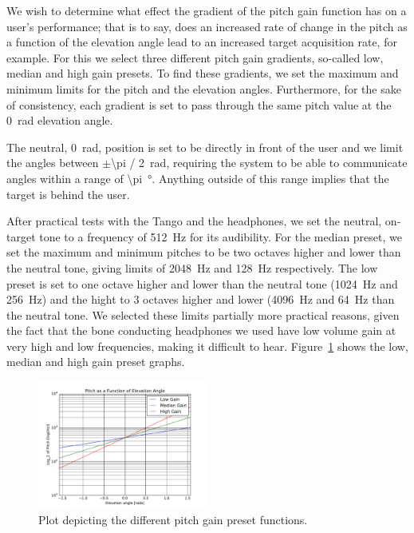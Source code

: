 \documentclass[format=sigconf, review=true, screen=true, anonymous=true]{acmart}
\begin{document}
We wish to determine what effect the gradient of the pitch gain function has on a user's performance; that is to say, does an increased rate of change in the pitch as a function of the elevation angle lead to an increased target acquisition rate, for example. For this we select three different pitch gain gradients, so-called low, median and high gain presets. To find these gradients, we set the maximum and minimum limits for the pitch and the elevation angles. Furthermore, for the sake of consistency, each gradient is set to pass through the same pitch value at the \SI{0}{\radian} elevation angle.   

The neutral, \SI{0}{\radian}, position is set to be directly in front of the user and we limit the angles between $\pm$\SI[quotient-mode=fraction]{\pi / 2}{\radian}, requiring the system to be able to communicate angles within a range of \SI{\pi}{\degree}. Anything outside of this range implies that the target is behind the user. 

After practical tests with the Tango and the headphones, we set the neutral, on-target tone to a frequency of \SI{512}{\hertz} for its audibility. For the median preset, we set the maximum and minimum pitches to be two octaves higher and lower than the neutral tone, giving limits of \SI{2048}{\hertz} and \SI{128}{\hertz} respectively. The low preset is set to one octave higher and lower than the neutral tone (\SI{1024}{\hertz} and \SI{256}{\hertz}) and the hight to 3 octaves higher and lower (\SI{4096}{\hertz} and \SI{64}{\hertz} than the neutral tone. We selected these limits partially more practical reasons, given the fact that the bone conducting headphones we used have low volume gain at very high and low frequencies, making it difficult to hear. Figure~\ref{fig:pitch-preset-plot} shows the low, median and high gain preset graphs.  

\begin{figure}
  \centering
  \includegraphics[width=0.5\textwidth]{figures/pitch_gradient.pdf}
  \caption{Plot depicting the different pitch gain preset functions.}
  \label{fig:pitch-preset-plot}
\end{figure}
\end{document}
